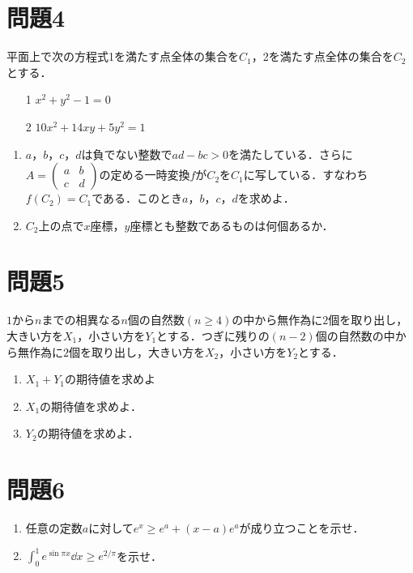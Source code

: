 \documentclass[unicode,12pt, A4j]{ltjsarticle}%
\begin{document}
\section{問題4}
平面上で次の方程式1を満たす点全体の集合を$C_1$，2を満たす点全体の集合を$C_2$とする．
\begin{itemize}
 \item[1] $x^2+y^2-1=0$
 \item[2] $10x^2+14xy+5y^2=1$
\end{itemize}
\begin{enumerate}
 \item $a$，$b$，$c$，$d$は負でない整数で$ad-bc>0$を満たしている．さらに$A=\begin{pmatrix} a&b\\ c&d\end{pmatrix}$の定める一時変換$f$が$C_2$を$C_1$に写している．すなわち$f(C_2)=C_1$である．このとき$a$，$b$，$c$，$d$を求めよ．
 \item $C_2$上の点で$x$座標，$y$座標とも整数であるものは何個あるか．
\end{enumerate}

\section{問題5}
$1$から$n$までの相異なる$n$個の自然数$(n\ge 4)$の中から無作為に$2$個を取り出し，大きい方を$X_1$，小さい方を$Y_1$とする．つぎに残りの$(n-2)$個の自然数の中から無作為に$2$個を取り出し，大きい方を$X_2$，小さい方を$Y_2$とする．
\begin{enumerate}
 \item $X_1+Y_1$の期待値を求めよ
 \item $X_1$の期待値を求めよ．
 \item $Y_2$の期待値を求めよ．
\end{enumerate}

\section{問題6}
\begin{enumerate}
 \item 任意の定数$a$に対して$e^x\ge e^a+(x-a)e^a$が成り立つことを示せ．
 \item ${\displaystyle \int_0^1 e^{\sin \pi x} \dd x \ge e^{2/\pi} }$を示せ．
\end{enumerate}
\end{document}
